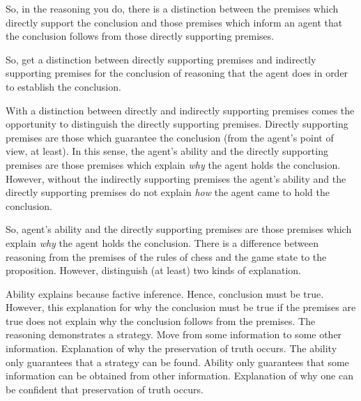 \documentclass[10pt]{article}
\newcommand{\hozlinedash}[0]{%
  \noindent\hdashrule[0.5ex][c]{\textwidth}{.1pt}{2.5pt}
}
\begin{document}
So, in the reasoning you do, there is a distinction between the premises which directly support the conclusion and those premises which inform an agent that the conclusion follows from those directly supporting premises.




So, get a distinction between directly supporting premises and indirectly supporting premises for the conclusion of reasoning that the agent does in order to establish the conclusion.



With a distinction between directly and indirectly supporting premises comes the opportunity to distinguish the directly supporting premises.
Directly supporting premises are those which {\color{red} guarantee} the conclusion (from the agent's point of view, at least).
In this sense, the agent's ability and the directly supporting premises are those premises which explain \emph{why} the agent holds the conclusion.
However, without the indirectly supporting premises the agent's ability and the directly supporting premises do not explain \emph{how} the agent came to hold the conclusion.


So, agent's ability and the directly supporting premises are those premises which explain \emph{why} the agent holds the conclusion.
There is a difference between reasoning from the premises of the rules of chess and the game state to the proposition.
However, distinguish (at least) two kinds of explanation.

Ability explains because factive inference.
Hence, conclusion must be true.
However, this explanation for why the conclusion must be true if the premises are true does not explain why the conclusion follows from the premises.
The reasoning demonstrates a strategy.
Move from some information to some other information.
Explanation of why the preservation of truth occurs.
The ability only guarantees that a strategy can be found.
Ability only guarantees that some information can be obtained from other information.
Explanation of why one can be confident that preservation of truth occurs.









\hozlinedash
\end{document}
